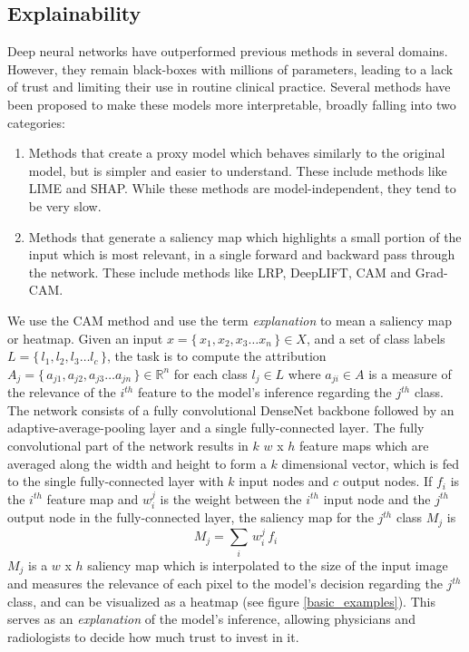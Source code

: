 \documentclass[12pt,twoside,a4paper]{report}
\begin{document}
\subsection{Explainability}
Deep neural networks have outperformed previous methods in several domains.
However, they remain black-boxes with millions of parameters, leading to a lack
of trust and limiting their use in routine clinical practice. Several methods
have been proposed to make these models more interpretable, broadly falling into
two categories:
\begin{enumerate}
\item{Methods that create a proxy model which behaves similarly to the original
    model, but is simpler and easier to understand. These include methods like
    LIME\cite{ribeiro2016should} and SHAP\cite{NIPS2017_7062}. While these
    methods are model-independent, they tend to be very slow.}
\item{Methods that generate a saliency map which highlights a small portion of
    the input which is most relevant, in a single forward and backward pass
    through the network. These include methods like LRP\cite{bach2015pixel},
    DeepLIFT\cite{shrikumar2017learning}, CAM\cite{zhou2016learning} and
    Grad-CAM\cite{selvaraju2017grad}.}
\end{enumerate}
We use the CAM method and use the term \emph{explanation} to mean a saliency map
or heatmap. Given an input $x = \{\, x_{1}, x_{2}, x_{3} \dots x_{n} \,\} \in
X$, and a set of class labels $L = \{\,l_1 ,l_2 ,l_3 \dots l_c\,\}$, the task is
to compute the attribution $A_j = \{\,a_{j1}, a_{j2}, a_{j3} \dots a_{jn}\,\}
\in \mathbb{R} ^n$ for each class $l_j \in L$ where $a_{ji} \in A$ is a measure
of the relevance of
the $i^{th}$ feature to the model's inference regarding the $j^{th}$ class.\\

The network consists of a fully convolutional DenseNet backbone followed by an
adaptive-average-pooling layer and a single fully-connected layer. The fully
convolutional part of the network results in $k$ $w$ x $h$ feature maps which
are averaged along the width and height to form a $k$ dimensional vector, which
is fed to the single fully-connected layer with $k$ input nodes and $c$ output
nodes. If $f_i$ is the $i^{th}$ feature map and $w^j _i$ is the weight between
the $i^{th}$ input node and the $j^{th}$ output node in the fully-connected
layer, the saliency map for the $j^{th}$ class $M_j$ is
\begin{equation}
  M_j = \sum _i \, w^j _i \, f_i
\end{equation}
$M_j$ is a $w$ x $h$ saliency map which is interpolated to the size of the input
image and measures the relevance of each pixel to the model's decision regarding
the $j^{th}$ class, and can be visualized as a heatmap (see figure
\ref{basic_examples}). This serves as an \emph{explanation} of the model's
inference, allowing physicians and radiologists to decide how much trust to
invest in it.
\end{document}
